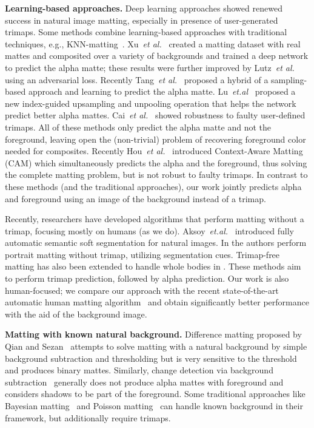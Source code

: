 \documentclass[10pt,twocolumn,letterpaper]{article}
\begin{document}
\textbf{Learning-based approaches.} Deep learning approaches showed renewed success in natural image matting, especially in presence of user-generated trimaps. Some methods combine learning-based approaches with traditional techniques, e.g., KNN-matting~\cite{shen2016deep,cho2016natural}. Xu~\textit{et al.}~\cite{xu2017deep} created a matting dataset with real mattes and composited over a variety of backgrounds and trained a deep network to predict the alpha matte; these results were further improved by Lutz~\textit{et al.}~\cite{lutz2018alphagan} using an adversarial loss. Recently Tang~\textit{et al.}~\cite{Tang_2019_CVPR} proposed a hybrid of a sampling-based approach and learning to predict the alpha matte. Lu~\textit{et.al}~\cite{lu2019indices} proposed a new index-guided upsampling and unpooling operation that helps the network predict better alpha mattes. Cai~\textit{et al.}~\cite{cai2019disentangled} showed robustness to faulty user-defined trimaps. All of these methods only predict the alpha matte and not the foreground, leaving open the (non-trivial) problem of recovering foreground color needed for composites. Recently Hou~\textit{et al.}~\cite{hou2019context} introduced Context-Aware Matting (CAM) which simultaneously predicts the alpha and the foreground, thus solving the complete matting problem, but is not robust to faulty trimaps. In contrast to these methods (and the traditional approaches), our work jointly predicts alpha and foreground using an image of the background instead of a trimap.

Recently, researchers have developed algorithms that perform matting without a trimap, focusing mostly on humans (as we do). Aksoy~\textit{et.al.}~\cite{aksoy2018semantic} introduced fully automatic semantic soft segmentation for natural images. In \cite{zhu2017fast,shen2016deep} the authors perform portrait matting without trimap, utilizing segmentation cues. Trimap-free matting has also been extended to handle whole bodies in \cite{zhang2019late,chen2018semantic}. These methods aim to perform trimap prediction, followed by alpha prediction. Our work is also human-focused; we compare our approach with the recent state-of-the-art automatic human matting algorithm~\cite{zhang2019late} and obtain significantly better performance with the aid of the background image.

\textbf{Matting with known natural background.} Difference matting proposed by Qian and Sezan~\cite{qian1999video} attempts to solve matting with a natural background by simple background subtraction and thresholding but is very sensitive to the threshold and produces binary mattes. Similarly, change detection via background subtraction~\cite{piccardi2004background,elgammal2000non} generally does not produce alpha mattes with foreground and considers shadows to be part of the foreground.  Some traditional approaches like Bayesian matting~\cite{chuang2001bayesian} and Poisson matting~\cite{sun2004poisson,gong2009near} can handle known background in their framework, but additionally require trimaps.  
\end{document}

